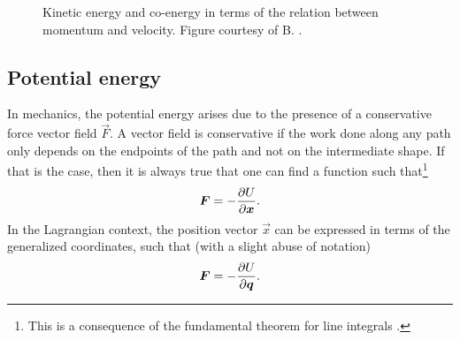 \begin{figure}[ht]
    \centering
    
    \caption{Kinetic energy and co-energy in terms of the relation between momentum and velocity. Figure courtesy of B. \citet{Krabbenborg2021}.}
    \label{fig:kinetic_energy}
\end{figure}

\subsection{Potential energy}
In mechanics, the potential energy arises due to the presence of a conservative force vector field $\vec{F}$. A vector field is conservative if the work done along any path only depends on the endpoints of the path and not on the intermediate shape. If that is the case, then it is always true that one can find a function such that\footnote{This is a consequence of the fundamental theorem for line integrals \cite{Stewart2012}.}
$$ \vb*{F} = - \pdv{U}{\vb*{x}}. $$
In the Lagrangian context, the position vector $\vec{x}$ can be expressed in terms of the generalized coordinates, such that (with a slight abuse of notation)
$$ \vb*{F} = -\pdv{U}{\ensuremath{\vb*{q}}}. $$

